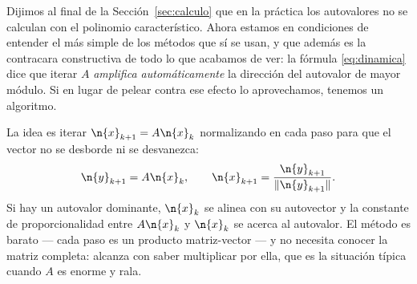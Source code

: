 Dijimos al final de la Sección~\ref{sec:calculo} que en la práctica los autovalores no se
calculan con el polinomio característico. Ahora estamos en condiciones de entender el más
simple de los métodos que sí se usan, y que además es la contracara constructiva de todo
lo que acabamos de ver: la fórmula \eqref{eq:dinamica} dice que iterar $A$ \emph{amplifica
automáticamente} la dirección del autovalor de mayor módulo. Si en lugar de pelear contra
ese efecto lo aprovechamos, tenemos un algoritmo.

La idea es iterar $\n{x}_{k+1}=A\n{x}_k$ normalizando en cada paso para que el vector no
se desborde ni se desvanezca:
\[
\n{y}_{k+1}=A\n{x}_k,
\qquad
\n{x}_{k+1}=\frac{\n{y}_{k+1}}{\|\n{y}_{k+1}\|}.
\]
Si hay un autovalor dominante, $\n{x}_k$ se alinea con su autovector y la constante de
proporcionalidad entre $A\n{x}_k$ y $\n{x}_k$ se acerca al autovalor. El método es
barato --- cada paso es un producto matriz-vector --- y no necesita conocer la matriz
completa: alcanza con saber multiplicar por ella, que es la situación típica cuando $A$
es enorme y rala.

